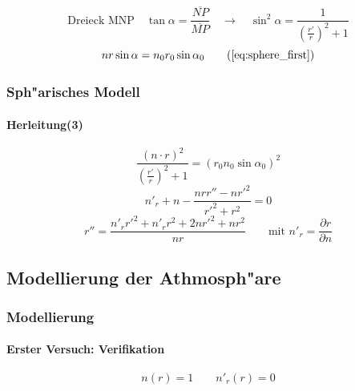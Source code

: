 \documentclass{beamer}
\begin{document}
{\begin{frame}
\begin{center}
\begin{tikzpicture} [scale=0.7, transform shape]
      \end{tikzpicture}
    \end{center}

    $$\text{Dreieck MNP} \quad \tan \alpha = \frac{\overline{NP}}{\overline{MP}} \quad \rightarrow \quad \sin^2 \alpha = \frac{1}{\left( \frac{r'}{r} \right)^2 + 1} $$    
    \begin{equation*}
      n r \sin \alpha = n_0 r_0 \sin \alpha_0 \tag{\ref{eq:sphere_first}}
    \end{equation*}
  \end{frame}
  
  \begin{frame}
    \frametitle{Sph"arisches Modell}
    \framesubtitle{Herleitung(3)}
    
    $$\frac{(n \cdot r)^2}{\left( \frac{r'}{r} \right)^2 + 1} = (r_0 n_0 \sin \alpha_0)^2$$
    \begin{equation} \label{eq:sphere_pre_ode}
      n'_r + n - \frac{nrr'' - nr'^2}{r'^2 + r^2} = 0
    \end{equation}
    \begin{equation} \label{eq:sphere_ode}
      r'' = \frac{n'_r r'^2 + n'_r r^2 + 2n r'^2 + nr^2}{n r} \qquad \text{mit } n'_r = \frac{\partial r}{\partial n}
    \end{equation}
  \end{frame}
  
  \subsection{Modellierung der Athmosph"are}
  \begin{frame}
    \frametitle{Modellierung}
    \framesubtitle{Erster Versuch: Verifikation}

    $$n(r) = 1 \qquad n'_r(r) = 0$$    
    
        

\end{frame}}
\end{document}
